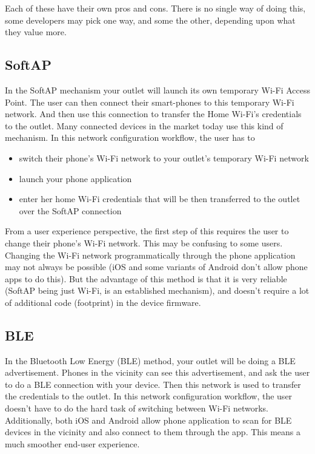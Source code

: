 \documentclass[main.tex]{subfiles}
\begin{document}
Each of these have their own pros and cons. There is no single way of doing this, some developers may pick one way, and some the other, depending upon what they value more.

\subsection{SoftAP}
In the SoftAP mechanism your outlet will launch its own temporary Wi-Fi Access Point. The user can then connect their smart-phones to this temporary Wi-Fi network. And then use this connection to transfer the Home Wi-Fi's credentials to the outlet. Many connected devices in the market today use this kind of mechanism. In this network configuration workflow, the user has to 
\begin{itemize}
    \item switch their phone's Wi-Fi network to your outlet's temporary Wi-Fi network
    \item launch your phone application
    \item enter her home Wi-Fi credentials that will be then transferred to the outlet over the SoftAP connection
\end{itemize}
From a user experience perspective, the first step of this requires the user to change their phone's Wi-Fi network. This may be confusing to some users. Changing the Wi-Fi network programmatically through the phone application may not always be possible (iOS and some variants of Android don't allow phone apps to do this).
But the advantage of this method is that it is very reliable (SoftAP being just Wi-Fi, is an established mechanism), and doesn't require a lot of additional code (footprint) in the device firmware.

\subsection{BLE}

In the Bluetooth Low Energy (BLE) method, your outlet will be doing a BLE advertisement. Phones in the vicinity can see this advertisement, and ask the user to do a BLE connection with your device. Then this network is used to transfer the credentials to the outlet.
In this network configuration workflow, the user doesn't have to do the hard task of switching between Wi-Fi networks. Additionally, both iOS and Android allow phone application to scan for BLE devices in the vicinity and also connect to them through the app. This means a much smoother end-user experience.
\end{document}
